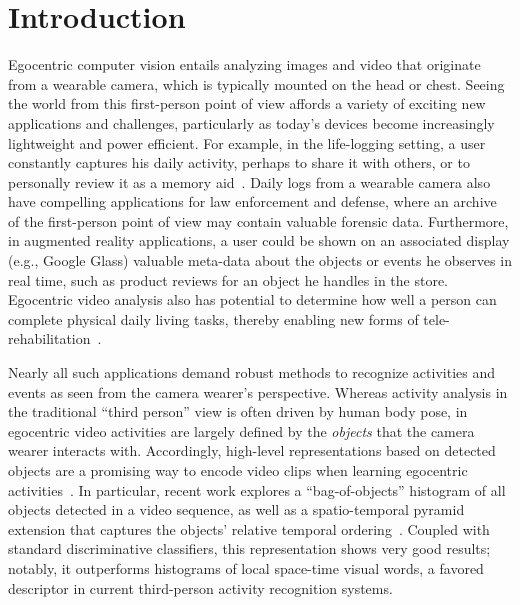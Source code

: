 
\section{Introduction}

Egocentric computer vision entails analyzing images and video that originate from a wearable camera, which is typically mounted on the head or chest.  Seeing the world from this first-person point of view affords a variety of exciting new applications and challenges, particularly as today's devices become increasingly lightweight and power efficient.  For example, in the life-logging setting, a user constantly captures his daily activity, perhaps to share it with others, or to personally review it as a memory aid~\cite{Hodges2011}.  Daily logs from a wearable camera also have compelling applications for law enforcement and defense, where an archive of the first-person point of view may contain valuable forensic data.  Furthermore, in augmented reality applications, a user could be shown on an associated display (e.g., Google Glass) valuable meta-data about the objects or events he observes in real time, such as product reviews for an object he handles in the store.  Egocentric video analysis also has potential to determine how well a person can complete physical daily living tasks, thereby enabling new forms of tele-rehabilitation~\cite{Kopp97,Ramanan12}.

Nearly all such applications demand robust methods to recognize activities and events as seen from the camera wearer's perspective.  Whereas activity analysis in the traditional ``third person'' view is often driven by human body pose, in egocentric video activities are largely defined by the \emph{objects} that the camera wearer interacts with.  Accordingly, high-level representations based on detected objects are a promising way to encode video clips when learning egocentric activities~\cite{ren-gu-cvpr2010,Fathi11,Fathi-ICCV2011,Ramanan12}.  In particular, recent work explores a ``bag-of-objects'' histogram of all objects detected in a video sequence, as well as a spatio-temporal pyramid extension that captures the objects' relative temporal ordering~\cite{Ramanan12}.  Coupled with standard discriminative classifiers, this representation shows very good results; notably, it outperforms histograms of local space-time visual words, a favored descriptor in current third-person activity recognition systems.

